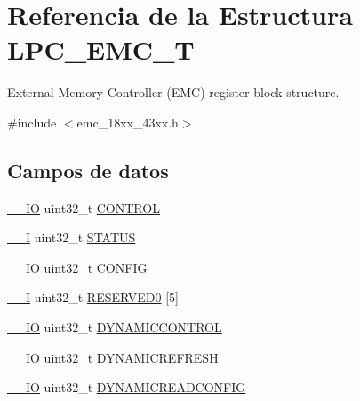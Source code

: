 \hypertarget{struct_l_p_c___e_m_c___t}{}\section{Referencia de la Estructura L\+P\+C\+\_\+\+E\+M\+C\+\_\+T}
\label{struct_l_p_c___e_m_c___t}


External Memory Controller (E\+MC) register block structure.  




{\ttfamily \#include $<$emc\+\_\+18xx\+\_\+43xx.\+h$>$}

\subsection*{Campos de datos}
\begin{DoxyCompactItemize}
\item 
\hyperlink{core__sc300_8h_aec43007d9998a0a0e01faede4133d6be}{\+\_\+\+\_\+\+IO} uint32\+\_\+t \hyperlink{struct_l_p_c___e_m_c___t_a60054d9772af540ff3d88432d724137f}{C\+O\+N\+T\+R\+OL}
\item 
\hyperlink{core__sc300_8h_af63697ed9952cc71e1225efe205f6cd3}{\+\_\+\+\_\+I} uint32\+\_\+t \hyperlink{struct_l_p_c___e_m_c___t_aece2c880dc5ba01a2fc9326dc080dc26}{S\+T\+A\+T\+US}
\item 
\hyperlink{core__sc300_8h_aec43007d9998a0a0e01faede4133d6be}{\+\_\+\+\_\+\+IO} uint32\+\_\+t \hyperlink{struct_l_p_c___e_m_c___t_aed40378e2ce292435df51ff247d0cb78}{C\+O\+N\+F\+IG}
\item 
\hyperlink{core__sc300_8h_af63697ed9952cc71e1225efe205f6cd3}{\+\_\+\+\_\+I} uint32\+\_\+t \hyperlink{struct_l_p_c___e_m_c___t_abcea022b884a52d0aa9657e2cdd15ce1}{R\+E\+S\+E\+R\+V\+E\+D0} \mbox{[}5\mbox{]}
\item 
\hyperlink{core__sc300_8h_aec43007d9998a0a0e01faede4133d6be}{\+\_\+\+\_\+\+IO} uint32\+\_\+t \hyperlink{struct_l_p_c___e_m_c___t_a051fd0c2c74de7fe0777963b604796f5}{D\+Y\+N\+A\+M\+I\+C\+C\+O\+N\+T\+R\+OL}
\item 
\hyperlink{core__sc300_8h_aec43007d9998a0a0e01faede4133d6be}{\+\_\+\+\_\+\+IO} uint32\+\_\+t \hyperlink{struct_l_p_c___e_m_c___t_a5debd6e13c44b10021d5230d3d2393d4}{D\+Y\+N\+A\+M\+I\+C\+R\+E\+F\+R\+E\+SH}
\item 
\hyperlink{core__sc300_8h_aec43007d9998a0a0e01faede4133d6be}{\+\_\+\+\_\+\+IO} uint32\+\_\+t \hyperlink{struct_l_p_c___e_m_c___t_a149b0b6e335a0991a3202867ef62f6b5}{D\+Y\+N\+A\+M\+I\+C\+R\+E\+A\+D\+C\+O\+N\+F\+IG}

\end{DoxyCompactItemize}
